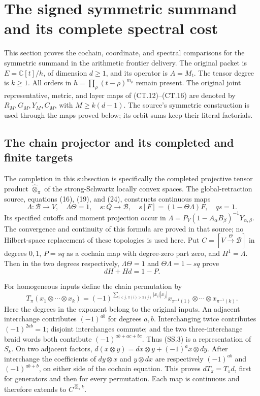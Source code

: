 \section{The signed symmetric summand and its complete spectral cost}
\label{sec:symmetric-spectral-cost}

This section proves the cochain, coordinate, and spectral comparisons
for the symmetric summand in the arithmetic frontier delivery.  The
original packet is \(E=\mathbb C[t]/h\), of dimension \(d\ge1\),
and its operator is \(A=M_t\).  The tensor degree is \(k\ge1\).
All orders in \(h=\prod_\rho(t-\rho)^{m_\rho}\) remain present.
The original joint representative, metric, and layer maps of
(CT.12)--(CT.16) are denoted by \(R_M,G_M,Y_M,C_M\), with
\(M\ge k(d-1)\).  The source's symmetric construction is used
through the maps proved below; its orbit sums keep their literal
factorials.

\subsection{The chain projector and its completed and finite targets}

The completion in this subsection is specifically the completed
projective tensor product \(\widehat\otimes_\pi\) of the
strong-Schwartz locally convex spaces.  The global-retraction source,
equations (16), (19), and (24), constructs continuous maps
\[
 \Lambda:\mathscr B\longrightarrow V,\quad
 \Lambda\Theta=1,\quad
 s:Q\longrightarrow\mathscr B,\quad
 s[F]=(1-\Theta\Lambda)F,\quad qs=1.                 \tag{SS.1}
\]
Its specified cutoffs and moment projection occur in
\(\Lambda=P_V(1-A_\alpha B_\beta)^{-1}Y_{\alpha,\beta}\).
The convergence and continuity of this formula are proved in that
source; no Hilbert-space replacement of these topologies is used here.
Put \(C=[V\xrightarrow\Theta\mathscr B]\) in degrees
\(0,1\), \(P=sq\) as a cochain map with degree-zero part zero,
and \(H^1=\Lambda\).  Then in the two degrees respectively,
\(\Lambda\Theta=1\) and \(\Theta\Lambda=1-sq\) prove
\[
 dH+Hd=1-P.                                           \tag{SS.2}
\]

For homogeneous inputs define the chain permutation by
\[
 T_\pi(x_1\otimes\cdots\otimes x_k)
 =(-1)^{\sum_{i<j,\,\pi(i)>\pi(j)}|x_i||x_j|}
 x_{\pi^{-1}(1)}\otimes\cdots\otimes x_{\pi^{-1}(k)}.
                                                               \tag{SS.3}
\]
Here the degrees in the exponent belong to the original inputs.
An adjacent interchange contributes \((-1)^{ab}\) for degrees
\(a,b\).  Interchanging twice contributes \((-1)^{2ab}=1\);
disjoint interchanges commute; and the two three-interchange braid
words both contribute \((-1)^{ab+ac+bc}\).  Thus (SS.3)
is a representation of \(S_k\).  On two adjacent factors,
\(d(x\otimes y)=dx\otimes y+(-1)^a x\otimes dy\).
After interchange the coefficients of \(dy\otimes x\) and
\(y\otimes dx\) are respectively \((-1)^{ab}\) and
\((-1)^{ab+b}\), on either side of the cochain equation.
This proves \(dT_\pi=T_\pi d\), first for generators and then
for every permutation.  Each map is continuous and therefore extends
to \(C^{\widehat\otimes_\pi k}\).

